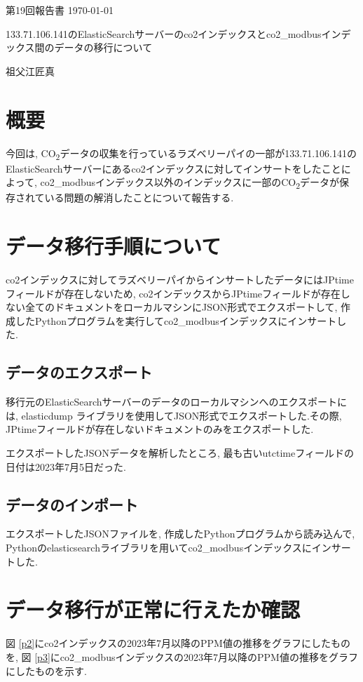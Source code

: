 \documentclass[a4j,12pt,]{jarticle}
\begin{document}
{\noindent\small 第19回報告書 \hfill\today}
\begin{center}
  {\Large 133.71.106.141のElasticSearchサーバーのco2インデックスとco2\_modbusインデックス間のデータの移行について}
\end{center}
\begin{flushright}
  祖父江匠真 \\
\end{flushright}

\section{概要}
今回は, CO\textsubscript{2}データの収集を行っているラズベリーパイの一部が133.71.106.141のElasticSearchサーバーにあるco2インデックスに対してインサートをしたことによって, co2\_modbusインデックス以外のインデックスに一部のCO\textsubscript{2}データが保存されている問題の解消したことについて報告する.

\section{データ移行手順について}

co2インデックスに対してラズベリーパイからインサートしたデータにはJPtimeフィールドが存在しないため, co2インデックスからJPtimeフィールドが存在しない全てのドキュメントをローカルマシンにJSON形式でエクスポートして, 作成したPythonプログラムを実行してco2\_modbusインデックスにインサートした.

\subsection{データのエクスポート}
移行元のElasticSearchサーバーのデータのローカルマシンへのエクスポートには, elasticdump \cite{1}ライブラリを使用してJSON形式でエクスポートした.その際, JPtimeフィールドが存在しないドキュメントのみをエクスポートした.

エクスポートしたJSONデータを解析したところ, 最も古いutctimeフィールドの日付は2023年7月5日だった.

\subsection{データのインポート}
エクスポートしたJSONファイルを, 作成したPythonプログラムから読み込んで, Pythonのelasticsearchライブラリを用いてco2\_modbusインデックスにインサートした.

\section{データ移行が正常に行えたか確認}
図 \ref{p2}にco2インデックスの2023年7月以降のPPM値の推移をグラフにしたものを, 図 \ref{p3}にco2\_modbusインデックスの2023年7月以降のPPM値の推移をグラフにしたものを示す.
\end{document}
